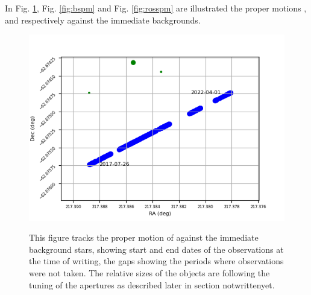 In Fig. \ref{fig:proxpm}, Fig. \ref{fig:bspm} and Fig. \ref{fig:rosspm} are
illustrated the proper motions \prox, {\bstar} and {\ross} respectively against
the immediate backgrounds.

\begin{figure}[!htbp]
\begin{center}
\includegraphics[scale=0.9]{images/pmprox.png} \\
\end{center}   
\caption{This figure tracks the proper motion of {\prox} against the immediate
background stars, showing start and end dates of the observations at the time
of writing, the gaps showing the periods where observations were not taken. The
relative sizes of the objects are following the tuning of the apertures as
described later in section notwrittenyet.} \protect\label{fig:proxpm}
\end{figure}

